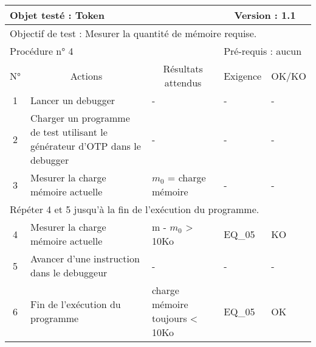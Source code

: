 \documentclass{"../../res/univ-projet"}
\begin{document}
\begin{center}
    \begin{tabular}{|c|p{5cm}|p{5cm}|p{1.5cm}|p{1.5cm}|}
      \hline
      \multicolumn{3}{|l|}{Objet testé : Token} & \multicolumn{2}{c|}{Version : 1.1}\\ \hline
      \multicolumn{5}{|l|}{Objectif de test : Mesurer la quantité de mémoire requise.}\\ \hline
      \multicolumn{3}{|l|}{Procédure n° 4} & \multicolumn{2}{p{3cm}|}{Pré-requis : aucun}\\ \hline
      \multicolumn{1}{|c|}{N°} & \multicolumn{1}{c|}{Actions} & \multicolumn{1}{c|}{Résultats attendus} & 
      \multicolumn{1}{c|}{Exigence} & \multicolumn{1}{c|}{OK/KO}\\ \hline
      1 & Lancer un debugger & - & - & - \\
      2 & Charger un programme de test utilisant le générateur d'OTP dans le debugger & - & - & -\\
      3 & Mesurer la charge mémoire actuelle & $m_0$ = charge mémoire & - & -\\
      \hline
      \multicolumn{5}{|l|}{Répéter 4 et 5 jusqu'à la fin de l'exécution du programme.}\\
      \hline
      4 & Mesurer la charge mémoire actuelle & m - $m_0$ > 10Ko & EQ\_05 & KO\\
      5 & Avancer d'une instruction dans le debuggeur & - & - & -\\ \hline
      6 & Fin de l'exécution du programme & charge mémoire toujours < 10Ko & EQ\_05 & OK \\ \hline
    \end{tabular}
    \vfill
    

\end{center}
\end{document}
